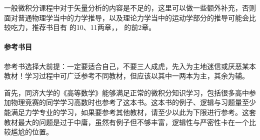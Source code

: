 一般微积分课程中对于矢量分析的内容是不足的，这里可以做一些额外补充，否则面对普通物理学当中的力学推导，以及理论力学当中的运动学部分的推导可能会比较吃力，推荐书目有 \textcite[托马斯大学微积分]{李伯民2009托马斯大学微积分} 的10、11两章，\textcite[数学分析新讲]{张筑生数学分析}，\textcite[工程数学——矢量分析与场论]{谢树艺2015工程数学} 的前2章。

\paragraph{参考书目}

参考书选择大前提：一定要适合自己，不要三人成虎，先入为主地迷信或厌恶某本教材！学习过程中可广泛参考不同教材，但应该以其中一两本为主，其余为辅。

首先，同济大学的《高等数学》能够满足正常的微积分知识学习，包括很多高中参加物理竞赛的同学学习高数时也参考了这本书。这本书的例子、逻辑与习题量至少能满足力学专业的学习，如果要参考其他教材，请至少以此为下限进行参考。这套教材最大的问题是过于中庸，虽然有例子但不够丰富，逻辑性与严密性卡在一个比较尴尬的位置。

